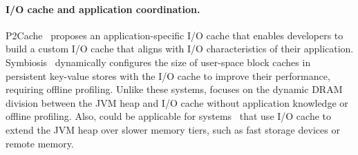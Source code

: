 \paragraph{\textbf{I/O cache and application coordination.}}
P2Cache~\cite{lee:p2cache} proposes an application-specific I/O cache that enables developers to build a custom I/O cache that aligns with I/O characteristics of their application.
%
Symbiosis~\cite{dai:symbiosis} dynamically configures the size of user-space block caches in persistent key-value stores with the I/O cache to improve their performance, requiring offline profiling.
%
Unlike these systems, \flexheapName{} focuses on the dynamic DRAM division between the JVM heap and I/O cache without application knowledge or offline profiling.
%
Also, \flexheapName{} could be applicable for systems~\cite{khanh:polar,teraheap,kolokasis:teracache,kolokasis:teraheap_toplas,kolokasis:smartsweep} that use I/O cache to extend the JVM heap over slower memory tiers, such as fast storage devices or remote memory.
